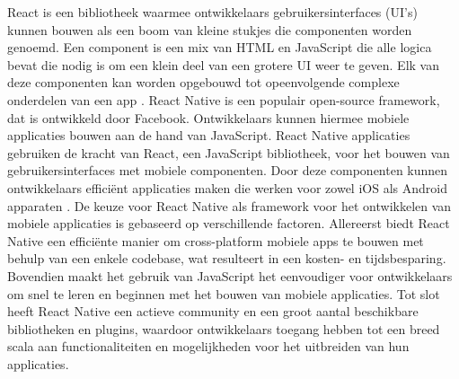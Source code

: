 React is een bibliotheek waarmee ontwikkelaars gebruikersinterfaces (UI's) kunnen bouwen als een boom van kleine stukjes die componenten worden genoemd. Een component is een mix van HTML en JavaScript die alle logica bevat die nodig is om een klein deel van een grotere UI weer te geven. Elk van deze componenten kan worden opgebouwd tot opeenvolgende complexe onderdelen van een app \autocite{Baer2018}. React Native is een populair open-source framework, dat is ontwikkeld door Facebook. Ontwikkelaars kunnen hiermee mobiele applicaties bouwen aan de hand van JavaScript. React Native applicaties gebruiken de kracht van React, een JavaScript bibliotheek, voor het bouwen van gebruikersinterfaces met mobiele componenten. Door deze componenten kunnen ontwikkelaars efficiënt applicaties maken die werken voor zowel iOS als Android apparaten \autocite{Vinnik2021}. De keuze voor React Native als framework voor het ontwikkelen van mobiele applicaties is gebaseerd op verschillende factoren. Allereerst biedt React Native een efficiënte manier om cross-platform mobiele apps te bouwen met behulp van een enkele codebase, wat resulteert in een kosten- en tijdsbesparing. Bovendien maakt het gebruik van JavaScript het eenvoudiger voor ontwikkelaars om snel te leren en beginnen met het bouwen van mobiele applicaties. Tot slot heeft React Native een actieve community en een groot aantal beschikbare bibliotheken en plugins, waardoor ontwikkelaars toegang hebben tot een breed scala aan functionaliteiten en mogelijkheden voor het uitbreiden van hun applicaties.
